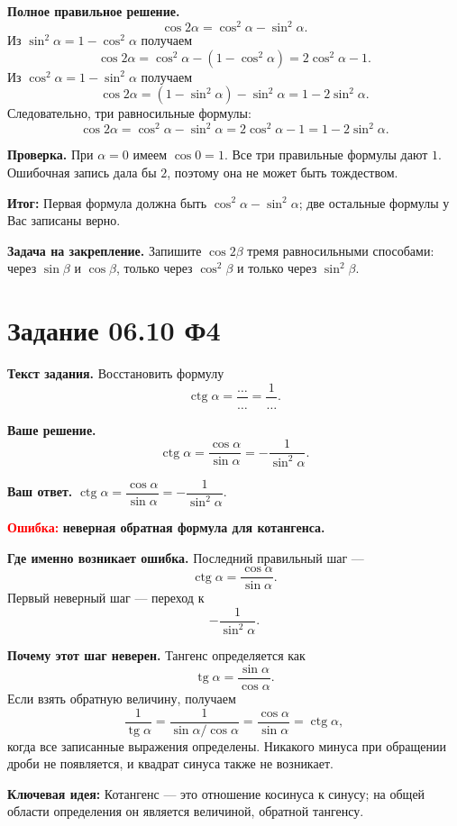 \documentclass[12pt,a4paper]{article}
\newcommand{\errorlabel}[1]{\textcolor{red}{\textbf{Ошибка:}} \textbf{#1}}
\newcommand{\keyidea}{\textcolor{blue!60!black}{\textbf{Ключевая идея:}}}
\newcommand{\resultlabel}{\textcolor{teal!60!black}{\textbf{Итог:}}}
\begin{document}
\textbf{Полное правильное решение.}
\[
\cos 2\alpha=\cos^2\alpha-\sin^2\alpha.
\]
Из $\sin^2\alpha=1-\cos^2\alpha$ получаем
\[
\cos 2\alpha
=\cos^2\alpha-(1-\cos^2\alpha)
=2\cos^2\alpha-1.
\]
Из $\cos^2\alpha=1-\sin^2\alpha$ получаем
\[
\cos 2\alpha
=(1-\sin^2\alpha)-\sin^2\alpha
=1-2\sin^2\alpha.
\]
Следовательно, три равносильные формулы:
\[
\boxed{\cos 2\alpha=\cos^2\alpha-\sin^2\alpha=2\cos^2\alpha-1=1-2\sin^2\alpha}.
\]

\textbf{Проверка.} При $\alpha=0$ имеем $\cos 0=1$. Все три правильные формулы дают $1$. Ошибочная запись дала бы $2$, поэтому она не может быть тождеством.

\resultlabel{} Первая формула должна быть $\cos^2\alpha-\sin^2\alpha$; две остальные формулы у Вас записаны верно.

\textbf{Задача на закрепление.} Запишите $\cos 2\beta$ тремя равносильными способами: через $\sin\beta$ и $\cos\beta$, только через $\cos^2\beta$ и только через $\sin^2\beta$.

\newpage
{}\label{task:0610f4}
\section*{Задание 06.10 Ф4}

\textbf{Текст задания.} Восстановить формулу
\[
\operatorname{ctg}\alpha=\frac{\ldots}{\ldots}=\frac{1}{\ldots}.
\]

\textbf{Ваше решение.}
\[
\operatorname{ctg}\alpha=\frac{\cos\alpha}{\sin\alpha}=-\frac{1}{\sin^2\alpha}.
\]

\textbf{Ваш ответ.} $\operatorname{ctg}\alpha=\dfrac{\cos\alpha}{\sin\alpha}=-\dfrac{1}{\sin^2\alpha}$.

\errorlabel{неверная обратная формула для котангенса.}

\textbf{Где именно возникает ошибка.} Последний правильный шаг ---
\[
\operatorname{ctg}\alpha=\frac{\cos\alpha}{\sin\alpha}.
\]
Первый неверный шаг --- переход к
\[
-\frac{1}{\sin^2\alpha}.
\]

\textbf{Почему этот шаг неверен.} Тангенс определяется как
\[
\operatorname{tg}\alpha=\frac{\sin\alpha}{\cos\alpha}.
\]
Если взять обратную величину, получаем
\[
\frac{1}{\operatorname{tg}\alpha}
=\frac{1}{\sin\alpha/\cos\alpha}
=\frac{\cos\alpha}{\sin\alpha}
=\operatorname{ctg}\alpha,
\]
когда все записанные выражения определены. Никакого минуса при обращении дроби не появляется, и квадрат синуса также не возникает.

\keyidea{} Котангенс --- это отношение косинуса к синусу; на общей области определения он является величиной, обратной тангенсу.
\end{document}
